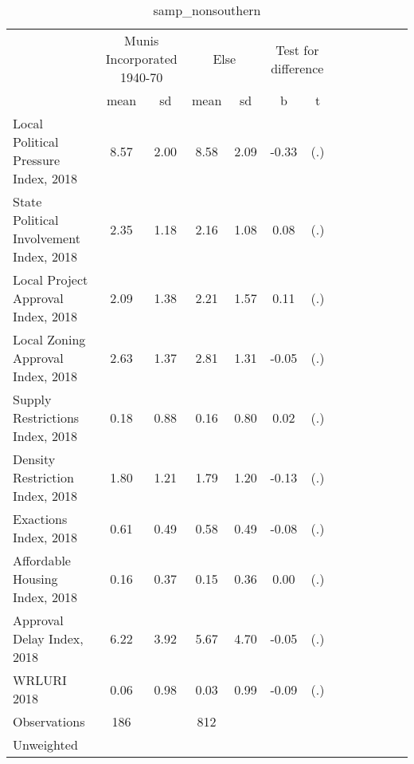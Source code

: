 \begin{table}[htbp]\centering
\def\sym#1{\ifmmode^{#1}\else\(^{#1}\)\fi}
\caption{samp\_nonsouthern \label{tab1}}
\begin{tabular}{l*{3}{cccc}}
\toprule
                    &\multicolumn{2}{c}{Munis Incorporated 1940-70}&\multicolumn{2}{c}{Else} &\multicolumn{2}{c}{Test for difference}\\
                    &        mean&          sd&        mean&          sd&           b         &           t\\
\midrule
Local Political Pressure Index, 2018&        8.57&        2.00&        8.58&        2.09&       -0.33         &         (.)\\
State Political Involvement Index, 2018&        2.35&        1.18&        2.16&        1.08&        0.08         &         (.)\\
Local Project Approval Index, 2018&        2.09&        1.38&        2.21&        1.57&        0.11         &         (.)\\
Local Zoning Approval Index, 2018&        2.63&        1.37&        2.81&        1.31&       -0.05         &         (.)\\
Supply Restrictions Index, 2018&        0.18&        0.88&        0.16&        0.80&        0.02         &         (.)\\
Density Restriction Index, 2018&        1.80&        1.21&        1.79&        1.20&       -0.13         &         (.)\\
Exactions Index, 2018&        0.61&        0.49&        0.58&        0.49&       -0.08         &         (.)\\
Affordable Housing Index, 2018&        0.16&        0.37&        0.15&        0.36&        0.00         &         (.)\\
Approval Delay Index, 2018&        6.22&        3.92&        5.67&        4.70&       -0.05         &         (.)\\
WRLURI 2018         &        0.06&        0.98&        0.03&        0.99&       -0.09         &         (.)\\
\midrule
Observations        &         186&            &         812&            &                     &            \\
\bottomrule
\multicolumn{7}{l}{\footnotesize Unweighted}\\
\end{tabular}
\end{table}

